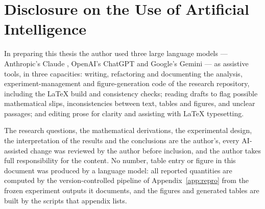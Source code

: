 \chapter*{Disclosure on the Use of Artificial Intelligence}

In preparing this thesis the author used three large language models ---
Anthropic's Claude \citep{anthropic2025claude}, OpenAI's ChatGPT
\citep{openai2025chatgpt} and Google's Gemini \citep{google2025gemini} --- as
assistive tools, in three capacities: writing, refactoring and documenting the
analysis, experiment-management and figure-generation code of the research
repository, including the \LaTeX{} build and consistency checks; reading
drafts to flag possible mathematical slips, inconsistencies between text,
tables and figures, and unclear passages; and editing prose for clarity and
assisting with \LaTeX{} typesetting.

The research questions, the mathematical derivations, the experimental
design, the interpretation of the results and the conclusions are the
author's, every AI-assisted change was reviewed by the author before
inclusion, and the author takes full responsibility for the content. No
number, table entry or figure in this document was produced by a language
model: all reported quantities are computed by the version-controlled
pipeline of Appendix~\ref{app:repro} from the frozen experiment outputs it
documents, and the figures and generated tables are built by the scripts that
appendix lists.
\clearpage
